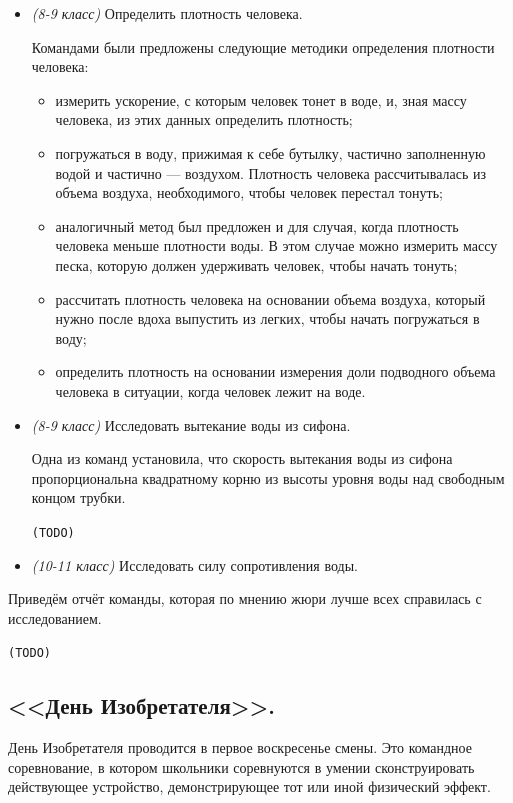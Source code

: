 \documentclass[12pt,a4paper,oneside,draft]{scrartcl}
\newcommand{\com}[1]{{\Large{\texttt{{\color{red}(#1)}}}}}
\begin{document}
\begin{itemize}
\item \textit{(8-9 класс)} Определить плотность человека.

Командами были предложены следующие методики определения плотности 
человека:
\begin{itemize}
\item измерить ускорение, с которым человек тонет в воде, и, зная 
  массу человека, из этих данных определить плотность;
\item погружаться в воду, прижимая к себе бутылку, частично 
  заполненную водой и частично --- воздухом. Плотность человека 
  рассчитывалась из объема воздуха, необходимого, чтобы человек 
  перестал тонуть;
\item аналогичный метод был предложен и для случая, когда плотность 
  человека меньше плотности воды. В этом случае можно измерить массу 
  песка, которую должен удерживать человек, чтобы начать тонуть;
\item рассчитать плотность человека на основании объема воздуха, 
  который нужно после вдоха выпустить из легких, чтобы начать 
  погружаться в воду;
\item определить плотность на основании измерения доли подводного 
  объема человека в ситуации, когда человек лежит на воде.
\end{itemize}

\item \textit{(8-9 класс)} Исследовать вытекание воды из сифона.

Одна из команд установила, что скорость вытекания воды из сифона 
  пропорциональна квадратному корню из высоты уровня воды над 
  свободным концом трубки.

\com{TODO}

\item \textit{(10-11 класс)} Исследовать силу сопротивления воды. 
\end{itemize}

Приведём отчёт команды, которая по мнению жюри лучше всех
справилась с исследованием. 



\com{TODO}

\subsection{<<День Изобретателя>>.}
\label{sec:day_inventor}

День Изобретателя проводится в первое воскресенье смены. Это командное
соревнование, в котором школьники соревнуются в умении сконструировать
действующее устройство, демонстрирующее тот или иной физический
эффект. 
\end{document}
